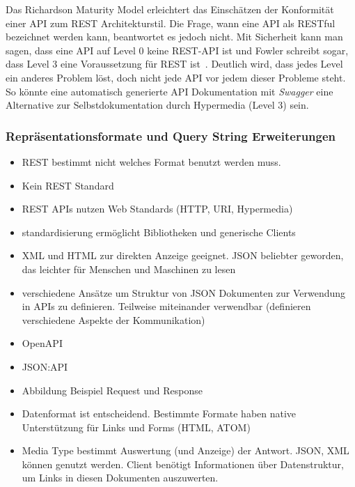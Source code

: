 \par
Das Richardson Maturity Model erleichtert das Einschätzen der Konformität einer API zum REST Architekturstil.
Die Frage, wann eine API als RESTful bezeichnet werden kann, beantwortet es jedoch nicht.
Mit Sicherheit kann man sagen, dass eine API auf Level 0 keine REST-API ist und Fowler schreibt sogar, dass Level 3 eine Voraussetzung für REST ist~\cite[vgl.][]{Fowler}.
Deutlich wird, dass jedes Level ein anderes Problem löst, doch nicht jede API vor jedem dieser Probleme steht.
So könnte eine automatisch generierte API Dokumentation mit \emph{Swagger}\cite{Swagger} eine Alternative zur Selbstdokumentation durch Hypermedia (Level 3) sein.
\subsubsection{Repräsentationsformate und Query String Erweiterungen}
\begin{itemize}
  \item REST bestimmt nicht welches Format benutzt werden muss.
  \item Kein REST Standard
  \item REST APIs nutzen Web Standards (HTTP, URI, Hypermedia)
  \item standardisierung ermöglicht Bibliotheken und generische Clients
  \item XML und HTML zur direkten Anzeige geeignet. JSON beliebter geworden, das leichter für Menschen und Maschinen zu lesen
  \item verschiedene Ansätze um Struktur von JSON Dokumenten zur Verwendung in APIs zu definieren. Teilweise miteinander verwendbar (definieren verschiedene Aspekte der Kommunikation)
  \item OpenAPI
  \item JSON:API
  \item Abbildung Beispiel Request und Response
  \item Datenformat ist entscheidend. Bestimmte Formate haben native Unterstützung für Links und Forms (HTML, ATOM)
  \item Media Type bestimmt Auswertung (und Anzeige) der Antwort. JSON, XML können genutzt werden. Client benötigt Informationen über Datenstruktur, um Links in diesen Dokumenten auszuwerten.
\end{itemize}